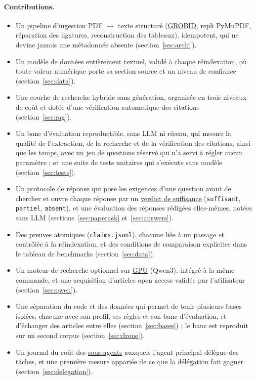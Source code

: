 \documentclass[11pt,a4paper]{article}
\newcommand{\cmd}[1]{\texttt{#1}}
\newcommand{\gl}[2]{\hyperlink{gl:#1}{\textcolor{glcolor}{#2}}}
\begin{document}
\paragraph{Contributions.}
\begin{itemize}
  \item Un pipeline d'ingestion PDF $\rightarrow$ texte structuré (\gl{GROBID}{GROBID}, repli PyMuPDF,
    réparation des ligatures, reconstruction des tableaux), idempotent, qui ne devine
    jamais une métadonnée absente (section~\ref{sec:archi}).
  \item Un modèle de données entièrement textuel, validé à chaque réindexation, où toute
    valeur numérique porte sa section source et un niveau de confiance
    (section~\ref{sec:data}).
  \item Une couche de recherche hybride sans génération, organisée en trois niveaux de coût
    et dotée d'une vérification automatique des citations (section~\ref{sec:rag}).
  \item Un banc d'évaluation reproductible, sans LLM ni réseau, qui mesure la qualité de
    l'extraction, de la recherche et de la vérification des citations, ainsi que les temps,
    avec un jeu de questions réservé qui n'a servi à régler aucun paramètre ; et une suite
    de tests unitaires qui s'exécute sans modèle (section~\ref{sec:tests}).
  \item Un protocole de réponse qui pose les \gl{exigence}{exigences} d'une question avant de chercher et
    ouvre chaque réponse par un \gl{verdict}{verdict de suffisance} (\cmd{suffisant}, \cmd{partiel},
    \cmd{absent}), et une évaluation des réponses rédigées elles-mêmes, notées sans LLM
    (sections~\ref{sec:paperask} et~\ref{sec:answers}).
  \item Des preuves atomiques (\cmd{claims.jsonl}), chacune liée à un passage et contrôlée à
    la réindexation, et des conditions de comparaison explicites dans le tableau de
    benchmarks (section~\ref{sec:data}).
  \item Un moteur de recherche optionnel sur \gl{GPU}{GPU} (Qwen3), intégré à la même commande, et une
    acquisition d'articles open access validée par l'utilisateur (section~\ref{sec:qwen}).
  \item Une séparation du code et des données qui permet de tenir plusieurs bases isolées,
    chacune avec son profil, ses règles et son banc d'évaluation, et d'échanger des articles
    entre elles (section~\ref{sec:bases}) ; le banc est reproduit sur un second corpus
    (section~\ref{sec:drone}).
  \item Un journal du coût des \gl{sousagent}{sous-agents} auxquels l'agent principal délègue
    des tâches, et une première mesure appariée de ce que la délégation fait gagner
    (section~\ref{sec:delegation}).
\end{itemize}
\end{document}
